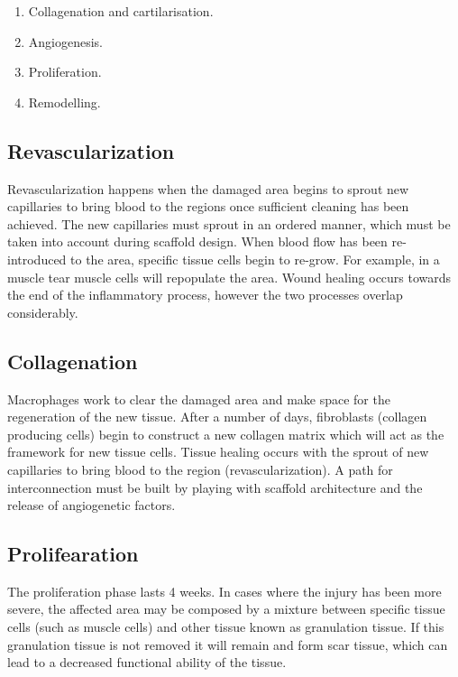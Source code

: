 \begin{multicols}{2}
	\begin{enumerate}
		\item Collagenation and cartilarisation.
		\item Angiogenesis.
		\item Proliferation.
		\item Remodelling.
	\end{enumerate}
\end{multicols}

	\subsection{Revascularization}
	Revascularization happens when the damaged area begins to sprout new capillaries to bring  blood to the regions once sufficient cleaning has been achieved.
	The new capillaries must sprout in an ordered manner, which must be taken into account during scaffold design.
	When blood flow has been re-introduced to the area, specific tissue cells begin to re-grow.
	For example, in a muscle tear muscle cells will repopulate the area.
	Wound healing occurs towards the end of the inflammatory process, however the two processes overlap considerably.

	\subsection{Collagenation}
	Macrophages work to clear the damaged area and make space for the regeneration of the new tissue.
	After a number of days, fibroblasts (collagen producing cells) begin to construct a new collagen matrix which will act as the framework for new tissue cells.
	Tissue healing occurs with the sprout of new capillaries to bring blood to the region (revascularization).
	A path for interconnection must be built by playing with scaffold architecture and the release of angiogenetic factors.

	\subsection{Prolifearation}
	The proliferation phase lasts 4 weeks.
	In cases where the injury has been more severe, the affected area may be composed by a mixture between specific tissue cells (such as muscle cells) and other tissue known as granulation tissue.
	If this granulation tissue is not removed it will remain and form scar tissue, which can lead to a decreased functional ability of the tissue.

